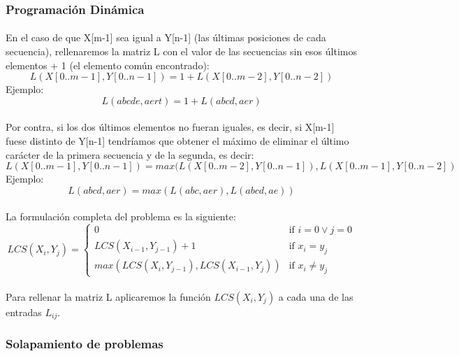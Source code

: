 \documentclass{article}
\begin{document}
	\subsubsection{Programación Dinámica}

		\paragraph{}
		En el caso de que X[m-1] sea igual a Y[n-1] (las últimas posiciones de cada secuencia), rellenaremos la matriz L con el valor de las secuencias sin esos últimos elementos + 1 (el elemento común encontrado):
		\[
		L(X[0..m-1], Y[0..n-1]) = 1 + L(X[0..m-2], Y[0..n-2])
		\]
		\newline{}
		Ejemplo: 
		\[
		L(abcde, aert) = 1 + L(abcd, aer)
		\]

		\paragraph{}
		Por contra, si los dos últimos elementos no fueran iguales, es decir, si X[m-1] fuese distinto de Y[n-1] tendríamos que obtener el máximo de eliminar el último carácter de la primera secuencia y de la segunda, es decir:
		\[
		L(X[0..m-1], Y[0..n-1]) = max(L(X[0..m-2], Y[0..n-1]), L(X[0..m-1], Y[0..n-2])
		\]
		\newline{}
		Ejemplo: 
		\[
		L(abcd, aer) = max( L(abc, aer), L(abcd, ae) )
		\]
		\paragraph{}
		
		La formulación completa del problema es la siguiente:
		\[
   		 LCS( X_{i}, Y_{j} ) = 
			\begin{cases}
			    	0									& \text{if } i = 0 \vee	 j = 0\\
    				LCS( X_{i-1}, Y_{j-1}) + 1					& \text{if } x_{i} = y_{j}\\
    				max(LCS( X_{i}, Y_{j-1}), LCS( X_{i-1}, Y_{j}))	& \text{if } x_{i} \not = y_{j}
			\end{cases}
		\]
		\paragraph{}
		Para rellenar la matriz L aplicaremos la función $LCS( X_{i}, Y_{j} )$ a cada una de las entradas $L_{ij}$.
		
	\subsubsection{Solapamiento de problemas}
\end{document}
